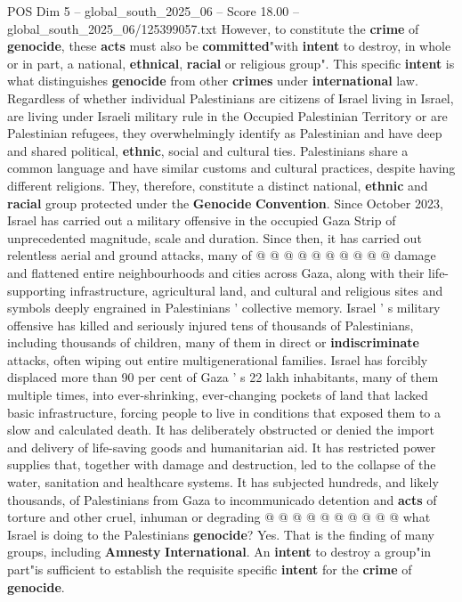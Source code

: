 \begin{textsample}{POS Dim 5 – global\_south\_2025\_06 – Score 18.00 – global\_south\_2025\_06/125399057.txt}
However, to constitute the \textbf{crime} of \textbf{genocide}, these \textbf{acts} must also be \textbf{committed}"with \textbf{intent} to destroy, in whole or in part, a national, \textbf{ethnical}, \textbf{racial} or religious group".
This specific \textbf{intent} is what distinguishes \textbf{genocide} from other \textbf{crimes} under \textbf{international} law.
Regardless of whether individual Palestinians are citizens of Israel living in Israel, are living under Israeli military rule in the Occupied Palestinian Territory or are Palestinian refugees, they overwhelmingly identify as Palestinian and have deep and shared political, \textbf{ethnic}, social and cultural ties.
Palestinians share a common language and have similar customs and cultural practices, despite having different religions.
They, therefore, constitute a distinct national, \textbf{ethnic} and \textbf{racial} group protected under the \textbf{Genocide} \textbf{Convention}.
Since October 2023, Israel has carried out a military offensive in the occupied Gaza Strip of unprecedented magnitude, scale and duration.
Since then, it has carried out relentless aerial and ground attacks, many of @ @ @ @ @ @ @ @ @ @ damage and flattened entire neighbourhoods and cities across Gaza, along with their life-supporting infrastructure, agricultural land, and cultural and religious sites and symbols deeply engrained in Palestinians ' collective memory.
Israel ' s military offensive has killed and seriously injured tens of thousands of Palestinians, including thousands of children, many of them in direct or \textbf{indiscriminate} attacks, often wiping out entire multigenerational families.
Israel has forcibly displaced more than 90 per cent of Gaza ' s 22 lakh inhabitants, many of them multiple times, into ever-shrinking, ever-changing pockets of land that lacked basic infrastructure, forcing people to live in conditions that exposed them to a slow and calculated death.
It has deliberately obstructed or denied the import and delivery of life-saving goods and humanitarian aid.
It has restricted power supplies that, together with damage and destruction, led to the collapse of the water, sanitation and healthcare systems.
It has subjected hundreds, and likely thousands, of Palestinians from Gaza to incommunicado detention and \textbf{acts} of torture and other cruel, inhuman or degrading @ @ @ @ @ @ @ @ @ @ what Israel is doing to the Palestinians \textbf{genocide}?
Yes.
That is the finding of many groups, including \textbf{Amnesty} \textbf{International}.
An \textbf{intent} to destroy a group"in part"is sufficient to establish the requisite specific \textbf{intent} for the \textbf{crime} of \textbf{genocide}.

\end{textsample}
